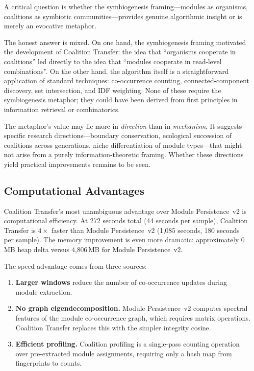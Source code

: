 \documentclass{../yalumba}
\begin{document}
A critical question is whether the symbiogenesis framing---modules as organisms,
coalitions as symbiotic communities---provides genuine algorithmic insight or is
merely an evocative metaphor.

The honest answer is mixed.  On one hand, the symbiogenesis framing motivated
the development of Coalition Transfer: the idea that ``organisms cooperate in
coalitions'' led directly to the idea that ``modules cooperate in read-level
combinations''.  On the other hand, the algorithm itself is a straightforward
application of standard techniques: co-occurrence counting, connected-component
discovery, set intersection, and IDF weighting.  None of these require the
symbiogenesis metaphor; they could have been derived from first principles in
information retrieval or combinatorics.

The metaphor's value may lie more in \emph{direction} than in \emph{mechanism}.
It suggests specific research directions---boundary conservation, ecological
succession of coalitions across generations, niche differentiation of module
types---that might not arise from a purely information-theoretic framing.
Whether these directions yield practical improvements remains to be seen.

\subsection{Computational Advantages}
\label{sec:discussion-computation}

Coalition Transfer's most unambiguous advantage over Module Persistence~v2 is
computational efficiency.  At 272 seconds total (44 seconds per sample),
Coalition Transfer is $4{\times}$ faster than Module Persistence~v2 (1{,}085
seconds, 180 seconds per sample).  The memory improvement is even more dramatic:
approximately 0\,MB heap delta versus 4{,}806\,MB for Module Persistence~v2.

The speed advantage comes from three sources:

\begin{enumerate}
  \item \textbf{Larger windows} reduce the number of co-occurrence updates
        during module extraction.
  \item \textbf{No graph eigendecomposition.}  Module Persistence~v2 computes
        spectral features of the module co-occurrence graph, which requires
        matrix operations.  Coalition Transfer replaces this with the simpler
        integrity cosine.
  \item \textbf{Efficient profiling.}  Coalition profiling is a single-pass
        counting operation over pre-extracted module assignments, requiring
        only a hash map from fingerprints to counts.
\end{enumerate}
\end{document}
